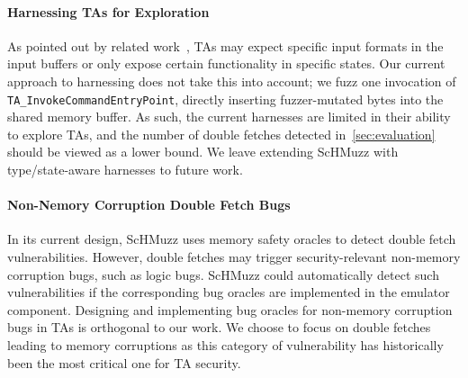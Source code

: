 \documentclass[letterpaper,twocolumn,10pt]{article}
\newcommand{\sysname}{ScHMuzz\xspace}
\newcommand{\stagetwo}{Double Fetch Snapshot Fuzzing\xspace}
\newcommand{\numvulns}{six\xspace}
\begin{document}
\paragraph{Harnessing TAs for Exploration}
As pointed out by related work~\cite{teezz,syncemu}, TAs may 
expect specific input formats in the input buffers or only expose certain functionality 
in specific states. Our current approach to harnessing does not take this into account; we fuzz 
one invocation of \texttt{TA\_InvokeCommandEntryPoint}, directly inserting fuzzer-mutated bytes 
into the shared memory buffer. As such, the current harnesses are limited in their ability to 
explore TAs, and the number of double fetches detected in~\autoref{sec:evaluation} should 
be viewed as a lower bound. We leave extending \sysname with type/state-aware harnesses to 
future work. 

\paragraph{Non-Nemory Corruption Double Fetch Bugs}
In its current design, \sysname uses memory safety oracles to detect double fetch vulnerabilities. 
However, double fetches may trigger security-relevant non-memory corruption 
bugs, such as logic bugs. \sysname could automatically detect such vulnerabilities if 
the corresponding bug oracles are implemented in the emulator component. Designing and implementing 
bug oracles for non-memory corruption bugs in TAs is orthogonal to our work. We choose to 
focus on double fetches leading to memory corruptions as this category of vulnerability has 
historically been the most critical one for TA security.

\end{document}
